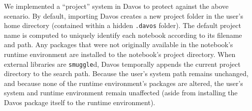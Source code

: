 \documentclass[preprint,12pt,a4paper]{elsarticle}
\begin{document}


We implemented a ``project'' system in Davos to protect against the
above scenario. By default, importing Davos creates a new project
folder in the user's home directory (contained within a hidden \texttt{.davos}
folder). The default project name is computed to uniquely identify each
notebook according to its filename and path. Any packages that were not
originally available in the notebook's runtime environment are installed to the
notebook's project directory. When external libraries are \texttt{smuggle}d,
Davos temporally appends the current project directory to the search
path. Because the user's system path remains unchanged, and because none of the
runtime environment's packages are altered, the user's system and runtime
environment remain unaffected (aside from installing the Davos package
itself to the runtime environment).
\end{document}
